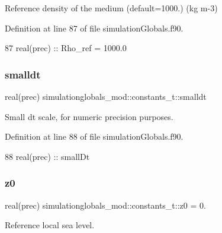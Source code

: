 Reference density of the medium (default=1000.) (kg m-\/3) 



Definition at line 87 of file simulation\+Globals.\+f90.


\begin{DoxyCode}
87         \textcolor{keywordtype}{real(prec)}   :: Rho\_ref = 1000.0
\end{DoxyCode}
\mbox{\label{structsimulationglobals__mod_1_1constants__t_a4e417855b60f5eb0f45d3094495f532b}} 
\subsubsection{\texorpdfstring{smalldt}{smalldt}}
{\footnotesize\ttfamily real(prec) simulationglobals\+\_\+mod\+::constants\+\_\+t\+::smalldt\hspace{0.3cm}{\ttfamily [private]}}



Small dt scale, for numeric precision purposes. 



Definition at line 88 of file simulation\+Globals.\+f90.


\begin{DoxyCode}
88         \textcolor{keywordtype}{real(prec)}   :: smallDt
\end{DoxyCode}
\mbox{\label{structsimulationglobals__mod_1_1constants__t_a9dab4143c1d5fd54c8337d78ea9b7d82}} 
\subsubsection{\texorpdfstring{z0}{z0}}
{\footnotesize\ttfamily real(prec) simulationglobals\+\_\+mod\+::constants\+\_\+t\+::z0 = 0.\hspace{0.3cm}{\ttfamily [private]}}



Reference local sea level. 



